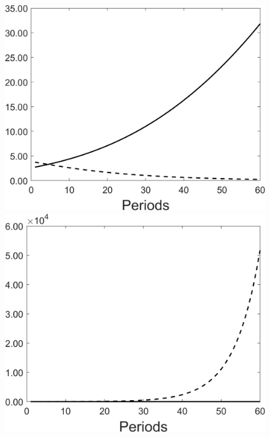 \begin{figure}[h!!]
\begin{minipage}[]{0.32\textwidth}
	\end{minipage}
	\begin{minipage}[]{0.32\textwidth}
		\includegraphics[width=1\textwidth]{../codding_model/Own/figures/Rep_agent/staticRam_LF_separate_xc_periods59_eppsilon0.40_zeta1.40_Ad08_Ac04_thetac0.70_thetad0.56_HetGrowth1_tauul0.181_util0_withtarget0_lgd0.png}
	\end{minipage}
\begin{minipage}[]{0.32\textwidth}
\includegraphics[width=1\textwidth]{../codding_model/Own/figures/Rep_agent/staticRam_LF_separate_ydyc_periods59_eppsilon0.40_zeta1.40_Ad08_Ac04_thetac0.70_thetad0.56_HetGrowth1_tauul0.181_util0_withtarget0_lgd0.png}

\end{minipage}
\end{figure}
